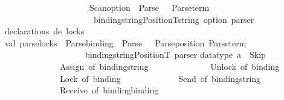 \begin{isabellebody}
\ \ \ \ \ \ \ \ \ \ \ \ \ \ \ \ \ \ \ {\isacharminus}{\kern0pt}{\isacharminus}{\kern0pt}\ {\isacharparenleft}{\kern0pt}Scan{\isachardot}{\kern0pt}option\ {\isacharparenleft}{\kern0pt}\ Parse{\isachardot}{\kern0pt}{\isachardollar}{\kern0pt}{\isachardollar}{\kern0pt}{\isachardollar}{\kern0pt}\ {\isachardoublequote}{\kern0pt}{\isacharequal}{\kern0pt}{\isachardoublequote}{\kern0pt}\ {\isacharbar}{\kern0pt}{\isacharminus}{\kern0pt}{\isacharminus}{\kern0pt}\ Parse{\isachardot}{\kern0pt}term{\isacharparenright}{\kern0pt}{\isacharparenright}{\kern0pt}\isanewline
\ \ \ \ \ \ \ \ \ \ \ \ \ \ \ \ \ \ \ \ {\isacharcolon}{\kern0pt}\ {\isacharparenleft}{\kern0pt}{\isacharparenleft}{\kern0pt}binding{\isacharasterisk}{\kern0pt}{\isacharparenleft}{\kern0pt}string{\isacharasterisk}{\kern0pt}Position{\isachardot}{\kern0pt}T{\isacharparenright}{\kern0pt}{\isacharparenright}{\kern0pt}{\isacharasterisk}{\kern0pt}string\ option{\isacharparenright}{\kern0pt}\ parser\isanewline
\isanewline
{\isacharparenleft}{\kern0pt}{\isacharasterisk}{\kern0pt}declarations\ de\ locks{\isacharasterisk}{\kern0pt}{\isacharparenright}{\kern0pt}\isanewline
val\ parse{\isacharunderscore}{\kern0pt}locks\ {\isacharequal}{\kern0pt}\ Parse{\isachardot}{\kern0pt}binding\ {\isacharminus}{\kern0pt}{\isacharminus}{\kern0pt}{\isacharbar}{\kern0pt}\ Parse{\isachardot}{\kern0pt}{\isachardollar}{\kern0pt}{\isachardollar}{\kern0pt}{\isachardollar}{\kern0pt}\ {\isachardoublequote}{\kern0pt}{\isacharcolon}{\kern0pt}{\isachardoublequote}{\kern0pt}\ {\isacharminus}{\kern0pt}{\isacharminus}{\kern0pt}\ {\isacharparenleft}{\kern0pt}Parse{\isachardot}{\kern0pt}position\ {\isacharparenleft}{\kern0pt}Parse{\isachardot}{\kern0pt}term{\isacharparenright}{\kern0pt}{\isacharparenright}{\kern0pt}\ \isanewline
\ \ \ \ \ \ \ \ \ \ \ \ \ \ \ \ \ \ {\isacharcolon}{\kern0pt}\ {\isacharparenleft}{\kern0pt}binding{\isacharasterisk}{\kern0pt}{\isacharparenleft}{\kern0pt}string{\isacharasterisk}{\kern0pt}Position{\isachardot}{\kern0pt}T{\isacharparenright}{\kern0pt}{\isacharparenright}{\kern0pt}\ parser\isanewline
\isanewline
\isanewline
datatype\ a\ {\isacharequal}{\kern0pt}\ Skip\isanewline
\ \ \ \ \ \ \ \ \ \ \ \ {\isacharbar}{\kern0pt}\ Assign\ of\ binding{\isacharasterisk}{\kern0pt}string\ \isanewline
\ \ \ \ \ \ \ \ \ \ \ \ {\isacharbar}{\kern0pt}\ Unlock\ of\ binding\ \isanewline
\ \ \ \ \ \ \ \ \ \ \ \ {\isacharbar}{\kern0pt}\ Lock\ of\ binding\isanewline
\ \ \ \ \ \ \ \ \ \ \ \ {\isacharbar}{\kern0pt}\ Send\ of\ binding{\isacharasterisk}{\kern0pt}string\ \isanewline
\ \ \ \ \ \ \ \ \ \ \ \ {\isacharbar}{\kern0pt}\ Receive\ of\ binding{\isacharasterisk}{\kern0pt}binding\isanewline

\end{isabellebody}
